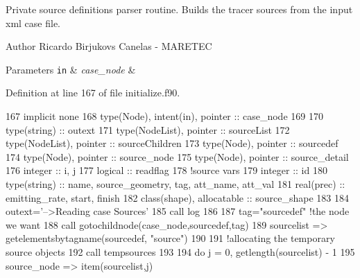 Private source definitions parser routine. Builds the tracer sources from the input xml case file. 

\begin{DoxyAuthor}{Author}
Ricardo Birjukovs Canelas -\/ M\+A\+R\+E\+T\+EC
\end{DoxyAuthor}

\begin{DoxyParams}[1]{Parameters}
\mbox{\tt in}  & {\em case\+\_\+node} & \\
\hline
\end{DoxyParams}


Definition at line 167 of file initialize.\+f90.


\begin{DoxyCode}
167     \textcolor{keywordtype}{implicit none}
168     \textcolor{keywordtype}{type}(Node), \textcolor{keywordtype}{intent(in)}, \textcolor{keywordtype}{pointer} :: case\_node
169 
170     \textcolor{keywordtype}{type}(string) :: outext
171     \textcolor{keywordtype}{type}(NodeList), \textcolor{keywordtype}{pointer} :: sourceList
172     \textcolor{keywordtype}{type}(NodeList), \textcolor{keywordtype}{pointer} :: sourceChildren
173     \textcolor{keywordtype}{type}(Node), \textcolor{keywordtype}{pointer} :: sourcedef
174     \textcolor{keywordtype}{type}(Node), \textcolor{keywordtype}{pointer} :: source\_node
175     \textcolor{keywordtype}{type}(Node), \textcolor{keywordtype}{pointer} :: source\_detail
176     \textcolor{keywordtype}{integer} :: i, j
177     \textcolor{keywordtype}{logical} :: readflag
178     \textcolor{comment}{!source vars}
179     \textcolor{keywordtype}{integer} :: id
180     \textcolor{keywordtype}{type}(string) :: name, source\_geometry, tag, att\_name, att\_val
181     \textcolor{keywordtype}{real(prec)} :: emitting\_rate, start, finish
182     \textcolor{keywordtype}{class}(shape), \textcolor{keywordtype}{allocatable} :: source\_shape
183 
184     outext=\textcolor{stringliteral}{'-->Reading case Sources'}
185     \textcolor{keyword}{call }log%
186 
187     tag=\textcolor{stringliteral}{"sourcedef"}    \textcolor{comment}{!the node we want}
188     \textcolor{keyword}{call }gotochildnode(case\_node,sourcedef,tag)
189     sourcelist => getelementsbytagname(sourcedef, \textcolor{stringliteral}{"source"})
190 
191     \textcolor{comment}{!allocating the temporary source objects}
192     \textcolor{keyword}{call }tempsources%
193 
194     \textcolor{keywordflow}{do} j = 0, getlength(sourcelist) - 1
195         source\_node => item(sourcelist,j)

\end{DoxyCode}
